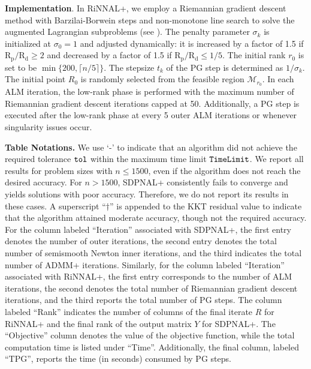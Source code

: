 \documentclass[11pt]{article}
\theoremstyle{plain}
\def\M{\mathcal{M}}
\def\tol{\tt{tol}}
\def\timelimit{\tt{TimeLimit}}
\begin{document}
\medskip

\noindent\textbf{Implementation}. 
In RiNNAL+, we employ a Riemannian gradient descent method with Barzilai-Borwein steps and non-monotone line search to solve the augmented Lagrangian subproblems (see \cite{RiNNAL,iannazzo2018riemannian, gao2021riemannian, tang2023feasible}). The penalty parameter $\sigma_k$ is initialized at $\sigma_0 = 1$ and adjusted dynamically: it is increased by a factor of 1.5 if $\operatorname{R_p}/\operatorname{R_d}\geq 2$ and decreased by a factor of 1.5 if $\operatorname{R_p}/\operatorname{R_d}\leq 1/5$. The initial rank $r_0$ is set to be $\operatorname{min}\{200,\lceil n/5 \rceil \}$. The stepsize $t_k$ of the PG step is determined as $1/\sigma_k$. The initial point $R_0$ is randomly selected from the feasible region $\M_{r_0}$. In each ALM iteration, the low-rank phase is performed with the maximum number of Riemannian gradient descent iterations capped at 50. Additionally, a PG step is executed 
after the low-rank phase at every 5 outer ALM iterations or whenever singularity issues occur.

\medskip

\noindent\textbf{Table Notations.} We use `-' to indicate that an algorithm did not achieve the required tolerance $\tol$ within the maximum time limit $\timelimit$. We report all results for problem sizes with $n \leq 1500$, even if the algorithm does not reach the desired accuracy. For $n > 1500$, SDPNAL+ consistently fails to converge and yields solutions with poor accuracy. Therefore, we do not report its results in these cases. A superscript ``$\dagger$'' is appended to the KKT residual value to indicate that the algorithm attained moderate accuracy, though not the required accuracy.
For the column labeled ``Iteration'' associated with SDPNAL+, the first entry denotes the number of outer iterations, the second entry denotes the total number of semismooth Newton inner iterations, and the third indicates the total number of ADMM+ iterations. Similarly, for the column labeled ``Iteration'' associated with RiNNAL+, the first entry corresponds to the number of ALM iterations, the second denotes the total number of Riemannian gradient descent iterations, and the third 
reports the total number of PG steps.
The column labeled ``Rank'' indicates the number of columns of the final iterate $R$ for RiNNAL+ and the final rank of the output matrix $Y$ for SDPNAL+. 
The ``Objective'' column denotes the value of the objective function, while the total computation time is listed under ``Time''. Additionally, the final column, labeled ``TPG'', reports the time (in seconds) consumed by PG steps.
\end{document}
